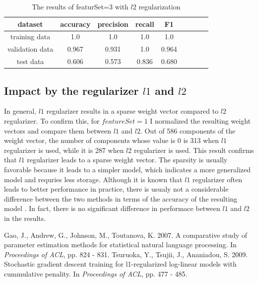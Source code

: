\begin{table}[!h]
  \begin{center}
  \begin{tabular}{|c|c|c|c|c|c|c|c|c|} \hline
    dataset & accuracy & precision & recall & F1 \\ \hline
    training data & 1.0 & 1.0 & 1.0 & 1.0 \\ \hline
    validation data & 0.967 & 0.931 & 1.0 & 0.964 \\ \hline
    test data & 0.606 & 0.573 & 0.836 & 0.680 \\ \hline
  \end{tabular}
  \caption{The results of featurSet=3 with $l2$ regularization}
  \label{tab:result_3_l2}
  \end{center}
\end{table}

\subsection*{Impact by the regularizer $l1$ and $l2$}
In general, $l1$ regularizer results in a sparse weight vector compared to $l2$ regularizer. To confirm this, for $featureSet=1$ I normalized the resulting weight vectors and compare them between $l1$ and $l2$. Out of 586 components of the weight vector, the number of components whose value is 0 is 313 when $l1$ regularizer is used, while it is 287 when $l2$ regularizer is used. This result confirms that $l1$ regularizer leads to a sparse weight vector. The sparsity is usually favorable because it leads to a simpler model, which indicates a more generalized model and requries less storage. Although it is known that $l1$ regularizer often leads to better performance in practice, there is usualy not a considerable difference between the two methods in terms of the accuracy of the resulting model \cite{gao2007, tsuruoka2009}. In fact, there is no significant difference in performace between $l1$ and $l2$ in the results.

\begin{thebibliography}{9}
 Gao, J., Andrew, G., Johnson, M., Toutanova, K. 2007. A comparative study of parameter estimation methods for statistical natural language processing. In {\it Proceedings of ACL}, pp. 824 - 831.
 Tsuruoka, Y., Tsujii, J., Ananiadou, S. 2009. Stochastic gradient descent training for l1-regularized log-linear models with cummulative penality. In {\it Proceedings of ACL}, pp. 477 - 485.
\end{thebibliography}



